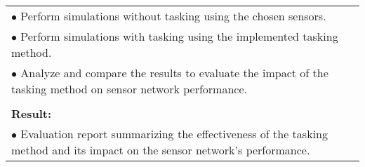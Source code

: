 \begin{table}[!h]
\begin{center}
\begin{tabular}{|p{35mm}||p{55mm}|p{50mm}||p{40mm}|}
      \multicolumn{4}{|p{150mm}|}{$\bullet$ Perform simulations without tasking using the chosen sensors.}\\
      \multicolumn{4}{|p{150mm}|}{$\bullet$ Perform simulations with tasking using the implemented tasking method.} \\
      \multicolumn{4}{|p{150mm}|}{$\bullet$ Analyze and compare the results to evaluate the impact of the tasking method on sensor network performance.} \\
      \multicolumn{4}{|p{150mm}|}{}                                                                                                                                                                           \\
      \multicolumn{4}{|p{150mm}|}{\textbf{Result:}}                                                                                                                                                       \\
      \multicolumn{4}{|p{150mm}|}{$\bullet$ Evaluation report summarizing the effectiveness of the tasking method and its impact on the sensor network's performance.}                                                                                                                          \\
      \hline
    \end{tabular}
  \end{center}
\end{table}

\clearpage

